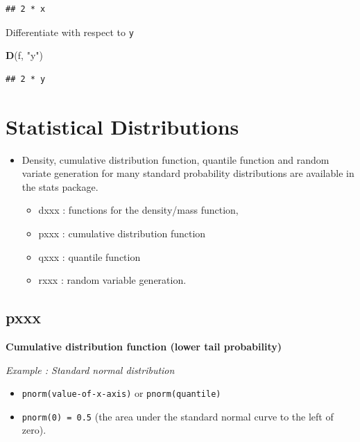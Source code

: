 \documentclass[]{book}
\newenvironment{Shaded}{\begin{snugshade}}{\end{snugshade}}
\newcommand{\KeywordTok}[1]{\textcolor[rgb]{0.13,0.29,0.53}{\textbf{#1}}}
\newcommand{\NormalTok}[1]{#1}
\newcommand{\StringTok}[1]{\textcolor[rgb]{0.31,0.60,0.02}{#1}}
\providecommand{\tightlist}{%
  \setlength{\itemsep}{0pt}\setlength{\parskip}{0pt}}
\begin{document}
\begin{verbatim}
## 2 * x
\end{verbatim}

Differentiate with respect to \texttt{y}

\begin{Shaded}
\begin{Highlighting}[]
\KeywordTok{D}\NormalTok{(f, }\StringTok{"y"}\NormalTok{)}
\end{Highlighting}
\end{Shaded}

\begin{verbatim}
## 2 * y
\end{verbatim}

\hypertarget{statistical-distributions}{%
\chapter{Statistical Distributions}\label{statistical-distributions}}

\begin{itemize}
\item
  Density, cumulative distribution function, quantile function and random variate generation for many standard probability distributions are available in the stats package.

  \begin{itemize}
  \tightlist
  \item
    dxxx : functions for the density/mass function,
  \item
    pxxx : cumulative distribution function
  \item
    qxxx : quantile function
  \item
    rxxx : random variable generation.
  \end{itemize}
\end{itemize}

\hypertarget{pxxx}{%
\section{pxxx}\label{pxxx}}

\textbf{Cumulative distribution function (lower tail probability)}

\emph{Example : Standard normal distribution}

\begin{itemize}
\item
  \texttt{pnorm(value-of-x-axis)} or \texttt{pnorm(quantile)}
\item
  \texttt{pnorm(0)\ =\ 0.5} (the area under the standard normal curve to the left of zero).
\end{itemize}
\end{document}
